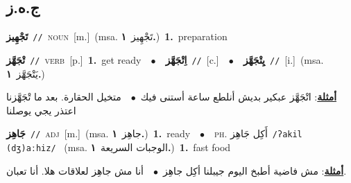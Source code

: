 \documentclass[10pt,a4paper,twoside]{article} %
\begin{document}
\begin{multicols}{2}
\vspace{-3mm}
\subsection*{\color{blue}\foreignlanguage{arabic}{ج.ه.ز}\color{blue}{}} 

{\setlength\topsep{0pt}\textbf{\foreignlanguage{arabic}{تَجْهِيز}}\ {\color{gray}\texttt{//}\color{black}}\ \textsc{noun}\ [m.]\ \color{gray}(msa. \foreignlanguage{arabic}{تَجْهِيز}~\foreignlanguage{arabic}{\textbf{١.}})\color{black}\ \textbf{1.}~preparation\ } \vspace{2mm}

{\setlength\topsep{0pt}\textbf{\foreignlanguage{arabic}{تْجَهَّز}}\ {\color{gray}\texttt{//}\color{black}}\ \textsc{verb}\ [p.]\ \textbf{1.}~get ready\ \ $\bullet$\ \ \setlength\topsep{0pt}\textbf{\foreignlanguage{arabic}{اِتْجَهَّز}}\ {\color{gray}\texttt{//}\color{black}}\ [c.]\ \ $\bullet$\ \ \setlength\topsep{0pt}\textbf{\foreignlanguage{arabic}{يِتْجَهَّز}}\ {\color{gray}\texttt{//}\color{black}}\ [i.]\ \color{gray}(msa. \foreignlanguage{arabic}{يَتْجَهَّز}~\foreignlanguage{arabic}{\textbf{١.}})\color{black}\  \begin{flushright}\color{gray}\foreignlanguage{arabic}{\textbf{\underline{\foreignlanguage{arabic}{أمثلة}}}: اتْجَهَّز عبكير بديش أنلطع ساعة أستنى فيك\ $\bullet$\ \  متخيل الحقارة. بعد ما تْجَهَّزنا اعتذر يجي يوصلنا}\end{flushright}\color{black}} \vspace{2mm}

{\setlength\topsep{0pt}\textbf{\foreignlanguage{arabic}{جَاهِز}}\ {\color{gray}\texttt{//}\color{black}}\ \textsc{adj}\ [m.]\ \color{gray}(msa. \foreignlanguage{arabic}{جاهِز}~\foreignlanguage{arabic}{\textbf{١.}})\color{black}\ \textbf{1.}~ready\ \ $\bullet$\ \ \textsc{ph.} \color{gray} \foreignlanguage{arabic}{أَكِل جَاهِز}\color{black}\ {\color{gray}\texttt{/{\sffamily ʔakil (dʒ)aːhiz}/}\color{black}}\ \color{gray} (msa. \foreignlanguage{arabic}{الوجبات السريعة}~\foreignlanguage{arabic}{\textbf{١.}})\color{black}\ \textbf{1.}~fast food\  \begin{flushright}\color{gray}\foreignlanguage{arabic}{\textbf{\underline{\foreignlanguage{arabic}{أمثلة}}}: مش فاضية أطبخ اليوم جيبلنا أكِل جاهِز\ $\bullet$\ \  أنا مش جاهِز لعلاقات هلا. أنا تعبان.}\end{flushright}\color{black}} \vspace{2mm}


\end{multicols}
\end{document}
